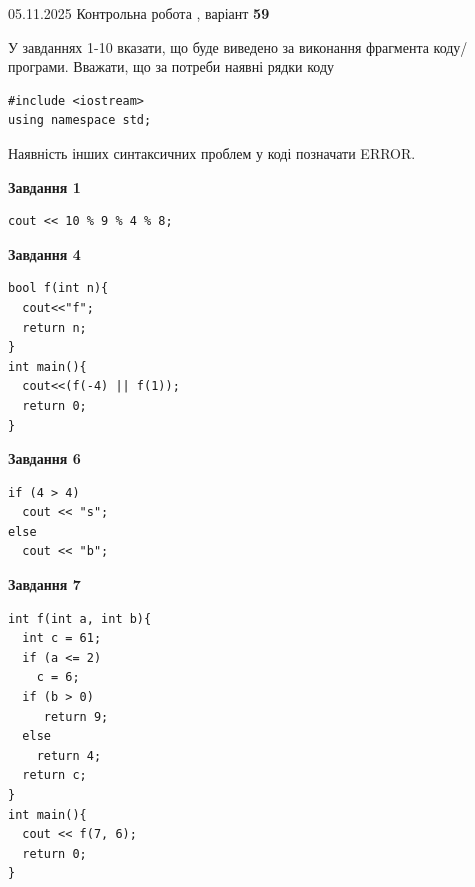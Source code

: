 \documentclass[12pt, ukrainian]{article}
\begin{document}
{\Large{05.11.2025 Контрольна робота , варіант  \No \textbf { 59 }\par}}
{
\begin {large}
У завданнях 1-10 вказати, що буде виведено за виконання фрагмента коду/про\-гра\-ми.
Вважати, що за потреби наявні рядки коду
\begin{verbatim}
#include <iostream>
using namespace std;
\end{verbatim}
Наявність інших синтаксичних проблем у коді позначати ERROR.

\begin{minipage}[t]{7.0cm}

\begin{center}
\textbf{Завдання 1}
\end{center}
\vspace{-8mm}

\begin{verbatim}
cout << 10 % 9 % 4 % 8;
\end{verbatim}



\begin{center}
\textbf{Завдання 4}
\end{center}
\vspace{-8mm}

\begin{verbatim}
bool f(int n){
  cout<<"f";
  return n;
}
int main(){
  cout<<(f(-4) || f(1));
  return 0;
}
\end{verbatim}



\begin{center}
\textbf{Завдання 6}
\end{center}
\vspace{-8mm}

\begin{verbatim}
if (4 > 4)
  cout << "s";
else
  cout << "b";
\end{verbatim}



\begin{center}
\textbf{Завдання 7}
\end{center}
\vspace{-8mm}

\begin{verbatim}
int f(int a, int b){
  int c = 61;
  if (a <= 2)
    c = 6;
  if (b > 0)
     return 9;
  else
    return 4;
  return c;
}
int main(){
  cout << f(7, 6);
  return 0;
}
\end{verbatim}


\end{minipage}
\end{large}}
\end{document}
